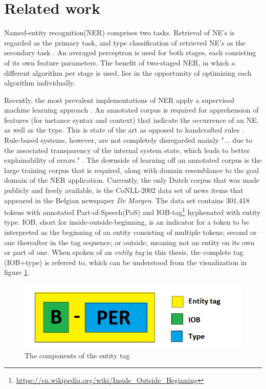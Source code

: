 \section{Related work} \label{sec:rel}
Named-entity recognition(NER) comprises two tasks. Retrieval of NE's is regarded as the primary task, and type classification of retrieved NE's as the secondary task \cite{buitinck2012two}. An averaged perceptron is used for both stages, each consisting of its own feature parameters. The benefit of two-staged NER, in which a different algorithm per stage is used, lies in the opportunity of optimizing each algorithm individually.  

Recently, the most prevalent implementations of NER apply a supervised machine learning approach \cite{desmet2014fine} \cite{buitinck2012two} \cite{graus2014semanticizing}. An annotated corpus is required for apprehension of features (for instance syntax and context) that indicate the occurrence of an NE, as well as the type. This is state of the art as opposed to handcrafted rules \cite{zhou2002named}. Rule-based systems, however, are not completely disregarded mainly "... due to the associated
transparency of the internal system state, which leads to better explainability of errors." \cite{chiticariu2010domain}. The downside of learning off an annotated corpus is the large training corpus that is required, along with domain resemblance to the goal domain of the NER application. Currently, the only Dutch corpus that was made publicly and freely available, is the CoNLL-2002 data set of news items that appeared in the Belgian newspaper \textit{De Morgen}. The data set contains 301,418 tokens with annotated Part-of-Speech(PoS) and IOB-tag\footnote{\url{https://en.wikipedia.org/wiki/Inside_Outside_Beginning}} hyphenated with entity type. IOB, short for inside-outside-beginning, is an indicator for a token to be interpreted as the beginning of an entity consisting of multiple tokens; second or one thereafter in the tag sequence; or outside, meaning not an entity on its own or part of one. When spoken of an \emph{entity tag} in this thesis, the complete tag (IOB+type) is referred to, which can be understood from the visualization in figure \ref{fig:iob}.

\begin{figure}
    \centering
    \includegraphics[scale=0.4]{fig/entity_tag}
    \caption{The components of the entity tag}
    \label{fig:iob}
\end{figure}

